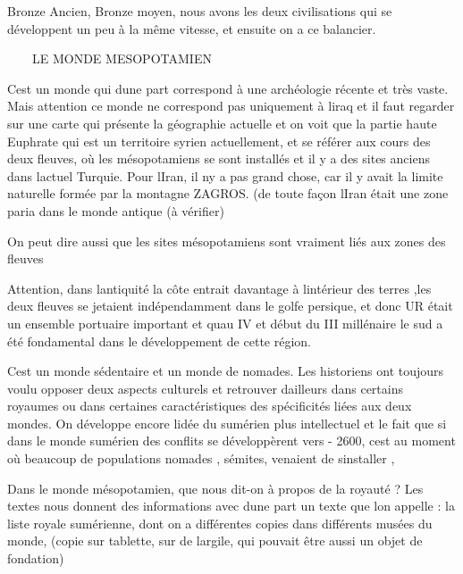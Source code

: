 \documentclass{article}
\begin{document}
Bronze Ancien, Bronze moyen, nous avons les deux civilisations qui se
développent un peu à la même vitesse, et ensuite on a ce balancier.

\ \ \ \ LE MONDE MESOPOTAMIEN

C{\textquotesingle}est un monde qui d{\textquotesingle}une part
correspond à une archéologie récente et très vaste. Mais attention ce
monde ne correspond pas uniquement à l{\textquotesingle}iraq et il faut
regarder sur une carte qui présente la géographie actuelle et on voit
que la partie haute Euphrate qui est un territoire syrien actuellement,
et se référer aux cours des deux fleuves, où les mésopotamiens se sont
installés  et il y a des sites anciens dans l{\textquotesingle}actuel
Turquie. Pour l{\textquotesingle}Iran, il n{\textquotesingle}y  a pas
grand chose, car il y avait la limite naturelle formée par la montagne 
ZAGROS. (de toute façon l{\textquotesingle}Iran était une zone paria
dans le monde antique (à vérifier)

On peut dire aussi que les sites mésopotamiens sont vraiment liés aux
zones des fleuves

Attention, dans l{\textquotesingle}antiquité la côte entrait davantage à
l{\textquotesingle}intérieur des terres ,les deux fleuves se jetaient
indépendamment dans le golfe persique,  et donc UR était un ensemble
portuaire important et qu{\textquotesingle}au IV et début du III
millénaire le sud a été fondamental dans le développement de cette
région. 

C{\textquotesingle}est un monde sédentaire et un monde de nomades. Les
historiens ont toujours voulu opposer deux aspects culturels et
retrouver d{\textquotesingle}ailleurs dans certains royaumes ou dans
certaines caractéristiques des spécificités liées aux deux mondes. On
développe encore l{\textquotesingle}idée du sumérien plus intellectuel
et le fait que si dans le monde sumérien des conflits se développèrent
vers - 2600, c{\textquotesingle}est au moment où beaucoup de
populations nomades , sémites, venaient de s{\textquotesingle}installer
, 

Dans le monde mésopotamien, que nous dit-on  à propos de la royauté ?
Les textes nous donnent des informations avec d{\textquotesingle}une
part un texte que l{\textquotesingle}on appelle : la liste royale
sumérienne, dont on a différentes copies dans différents musées du
monde, (copie sur tablette, sur de l{\textquotesingle}argile, qui
pouvait être aussi un objet de fondation)
\end{document}
